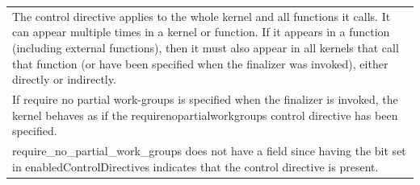 \documentclass[final,oneside]{book}
\begin{document}
\begin{longtable}{@{\hspace{2em}}p{\linewidth-2em}}
The control directive applies to the whole kernel and all functions it calls. It can appear multiple times in a kernel or function. If it appears in a function (including external functions), then it must also appear in all kernels that call that function (or have been specified when the finalizer was invoked), either directly or indirectly.\\[2mm]
If require no partial work-groups is specified when the finalizer is invoked, the kernel behaves as if the requirenopartialworkgroups control directive has been specified.\\[2mm]
require_\-no_\-partial_\-work_\-groups does not have a field since having the bit set in enabledControlDirectives indicates that the control directive is present.
\end{longtable}
\end{document}
